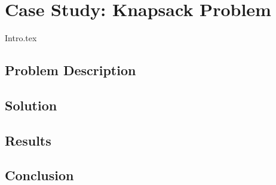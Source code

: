 \chapter{Case Study: Knapsack Problem}
\label{chap:knapsack}
  {Intro.tex}
  \section{Problem Description}
  \label{sec:knapsack:probl}
    \Blindtext
  \section{Solution}
  \label{sec:knapsack:sol}
    \Blindtext
  \section{Results}
  \label{sec:knapsack:res}
    \Blindtext
  \section{Conclusion}
  \label{sec:knapsack:concl}
    \Blindtext
